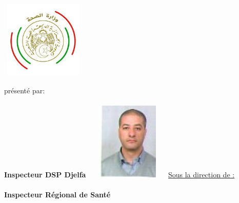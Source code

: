 \thispagestyle{empty}
\begin{center}
\vfill
% 		
		\vfill
		\Large{\textbf{
		\radp \\
		\ms \\
		\vfill
		\ispg\\
		\ispr\\
		}}
		\vfill
		\includegraphics[width=4cm,height=3.7cm]{img/msp.jpg}
		\vfill


		\vfill

		\large{présenté par:}\\
		\textbf{
		        \np \\
				    }
		\textbf {Inspecteur DSP Djelfa}		    
		\vfill
		\includegraphics[width=4cm,height=3.7cm]{img/redha.jpg}
		\vfill
		\underline{Sous la direction de :}\\
		\textbf {\npp }\\
		\textbf {Inspecteur Régional de Santé}
		\vfill
\end{center}

